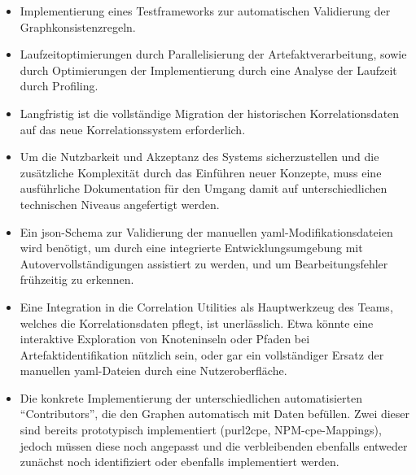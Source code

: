 \begin{itemize}
    \itemsep0em
    \item Implementierung eines Testframeworks zur automatischen Validierung der Graphkonsistenzregeln.
    \item Laufzeitoptimierungen durch Parallelisierung der Artefaktverarbeitung, sowie durch Optimierungen der Implementierung durch eine Analyse der Laufzeit durch Profiling.
    \item Langfristig ist die vollständige Migration der historischen Korrelationsdaten auf das neue Korrelationssystem erforderlich.
    \item Um die Nutzbarkeit und Akzeptanz des Systems sicherzustellen und die zusätzliche Komplexität durch das Einführen neuer Konzepte, muss eine ausführliche Dokumentation für den Umgang damit auf unterschiedlichen technischen Niveaus angefertigt werden.
    \item Ein \acrshort{json}-Schema zur Validierung der manuellen \acrshort{yaml}-Modifikationsdateien wird benötigt, um durch eine integrierte Entwicklungsumgebung mit Autovervollständigungen assistiert zu werden, und um Bearbeitungsfehler frühzeitig zu erkennen.
    \item Eine Integration in die Correlation Utilities als Hauptwerkzeug des Teams, welches die Korrelationsdaten pflegt, ist unerlässlich.
    Etwa könnte eine interaktive Exploration von Knoteninseln oder Pfaden bei Artefaktidentifikation nützlich sein, oder gar ein vollständiger Ersatz der manuellen \acrshort{yaml}-Dateien durch eine Nutzeroberfläche.
    \item Die konkrete Implementierung der unterschiedlichen automatisierten \enquote{Contributors}, die den Graphen automatisch mit Daten befüllen.
    Zwei dieser sind bereits prototypisch implementiert (purl2cpe, NPM-\acrshort{cpe}-Mappings), jedoch müssen diese noch angepasst und die verbleibenden ebenfalls entweder zunächst noch identifiziert oder ebenfalls implementiert werden.
\end{itemize}
